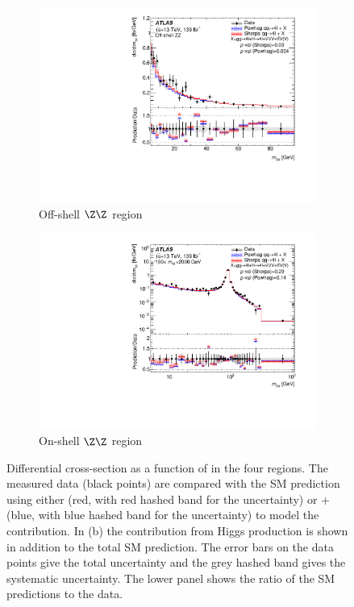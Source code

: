 \begin{figure}[htb!]
\begin{subfigure}{.49\textwidth}
      \includegraphics[width=.99\linewidth]{Figures/m4l/UnfoldedResults/linY_Unfolded_Data_m34_m4loffshell.pdf}  \caption{Off-shell $\Z\Z$ region}\label{fig:sub-third}
    \end{subfigure}
    \begin{subfigure}{.49\textwidth}\centering
      \includegraphics[width=.99\linewidth]{Figures/m4l/UnfoldedResults/Unfolded_Data_m34_m4l180-2000.pdf}  \caption{On-shell $\Z\Z$ region}\label{fig:sub-fourth}
    \end{subfigure}
    \caption{Differential cross-section as a function of \mZTwo{} in the four
        \mFourL{} regions. The measured data (black points) are  compared with the SM prediction using either \SHERPA{} (red, with red hashed band for the uncertainty) or \POWHEG{} + \pythia{} (blue, with blue hashed band for the uncertainty) to model the \qqFourL{} contribution. In (b) the contribution from Higgs production is shown in addition to the total SM prediction. The error bars on the data points give the total uncertainty and the grey hashed band gives the systematic uncertainty. \Pvalue{} The  lower panel shows the ratio of the SM predictions to the data.}
    \label{fig:m34_m4l}
\end{figure}

